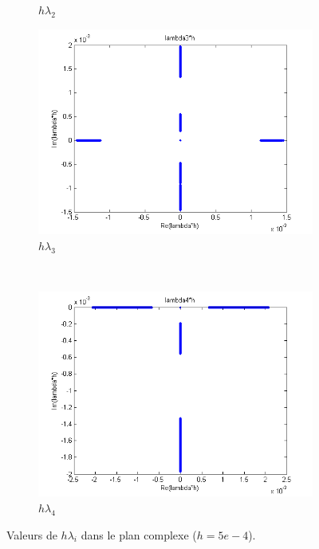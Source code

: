 \begin{figure}
\begin{subfigure}[b]{0.5\textwidth}
    \caption{$h \lambda_2$}
  \end{subfigure}
  \begin{subfigure}[b]{0.5\textwidth}
    \includegraphics[width=\textwidth]{images/Q1_hlambda3.png}
    \caption{$h \lambda_3$}
  \end{subfigure}%
  ~
  \begin{subfigure}[b]{0.5\textwidth}
    \includegraphics[width=\textwidth]{images/Q1_hlambda4.png}
    \caption{$h \lambda_4$}
  \end{subfigure}
  \caption{Valeurs de $h \lambda_i$ dans le plan complexe ($h=5e-4$).}
  \label{fig:hlambda}
\end{figure}

